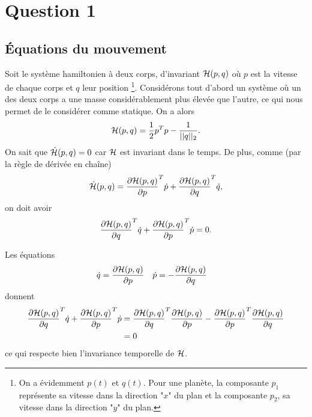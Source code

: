 \section{Question 1}
\subsection{Équations du mouvement}
Soit le système hamiltonien à deux corps, d'invariant $\mathcal{H} (p,q)$ où $p$ est la vitesse de chaque corps et $q$ leur position \footnote{On a évidemment $p(t)$ et $q(t)$. Pour une planète, la composante $p_1$ représente sa vitesse dans la direction "$x$" du plan et la composante $p_2$, sa vitesse dans la direction "$y$" du plan.}. Considérons tout d'abord un système où un des deux corps a une masse considérablement plus élevée que l'autre, ce qui nous permet de le considérer comme statique. On a alors 
$$\mathcal{H} (p,q) = \frac{1}{2} p^T p - \frac{1}{||q||_2} . $$
On sait que $\dot{\mathcal{H}}(p,q) = 0$ car $\mathcal{H}$ est invariant dans le temps.
De plus, comme (par la règle de dérivée en chaîne)
\[
  \dot{\mathcal{H}}(p,q) = \frac{\partial \mathcal{H}(p,q)}{\partial p}^T\dot{p} + \frac{\partial \mathcal{H}(p,q)}{\partial q}^T\dot{q},
\]
on doit avoir
\[
  \frac{\partial \mathcal{H}(p,q)}{\partial q}^T\dot{q} + \frac{\partial \mathcal{H}(p,q)}{\partial p}^T\dot{p} = 0.
\]

Les équations
\begin{align*}
  \dot{q} & = \frac{\partial \mathcal{H}(p,q)}{\partial p} & \dot{p} & = -\frac{\partial \mathcal{H}(p,q)}{\partial q}
\end{align*}
donnent
\begin{align*}
  \frac{\partial \mathcal{H}(p,q)}{\partial q}^T\dot{q} + \frac{\partial \mathcal{H}(p,q)}{\partial p}^T\dot{p} & =
  \frac{\partial \mathcal{H}(p,q)}{\partial q}^T\frac{\partial \mathcal{H}(p,q)}{\partial p} - \frac{\partial \mathcal{H}(p,q)}{\partial p}^T\frac{\partial \mathcal{H}(p,q)}{\partial q}\\
  & = 0
\end{align*}
ce qui respecte bien l'invariance temporelle de $\mathcal{H}$.

